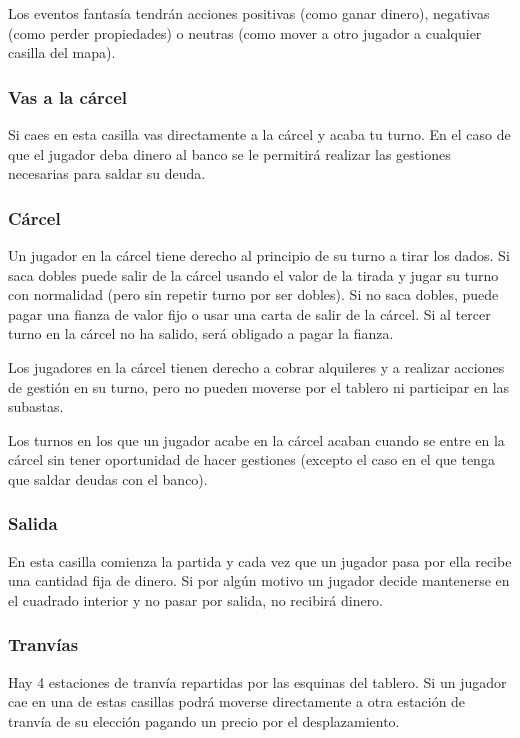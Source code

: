 Los eventos fantasía tendrán acciones positivas (como ganar dinero),
negativas (como perder propiedades) o neutras (como mover a otro 
jugador a cualquier casilla del mapa).

\subsubsection{Vas a la cárcel}
Si caes en esta casilla vas directamente a la cárcel y acaba tu turno.
En el caso de que el jugador deba dinero al banco se le permitirá realizar
las gestiones necesarias para saldar su deuda.

\subsubsection{Cárcel}
Un jugador en la cárcel tiene derecho al principio de su turno a 
tirar los dados. Si saca dobles puede salir de la cárcel usando 
el valor de la tirada y jugar su turno con normalidad (pero sin repetir turno por ser dobles).
Si no saca dobles, puede pagar una fianza de valor fijo o usar
una carta de salir de la cárcel. Si al tercer turno en la cárcel no ha 
salido, será obligado a pagar la fianza.

Los jugadores en la cárcel tienen derecho a cobrar alquileres y a realizar
acciones de gestión en su turno, pero no pueden moverse por el tablero ni
participar en las subastas.

Los turnos en los que un jugador acabe en la cárcel acaban cuando se 
entre en la cárcel sin tener oportunidad de hacer gestiones (excepto
el caso en el que tenga que saldar deudas con el banco).

\subsubsection{Salida}
En esta casilla comienza la partida y cada vez que un jugador pasa por
ella recibe una cantidad fija de dinero. Si por algún motivo un jugador 
decide mantenerse en el cuadrado interior y no pasar por salida, no recibirá
dinero.

\subsubsection{Tranvías}
Hay 4 estaciones de tranvía repartidas por las esquinas del tablero. Si un 
jugador cae en una de estas casillas podrá moverse directamente a otra 
estación de tranvía de su elección pagando un precio por el desplazamiento.


